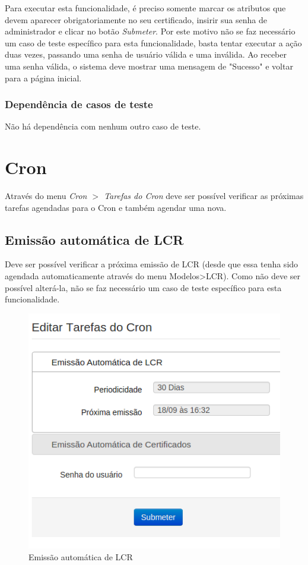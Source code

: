 Para executar esta funcionalidade, é preciso somente marcar os atributos que devem aparecer obrigatoriamente no seu certificado, insirir sua senha de administrador e clicar no botão \textit{Submeter}. Por este motivo não se faz necessário um  caso de teste específico para esta funcionalidade, basta tentar executar a ação duas vezes, passando uma senha de usuário válida e uma inválida. Ao receber uma senha válida, o sistema deve mostrar uma mensagem de "Sucesso" e voltar para a página inicial.

\subsubsection{Dependência de casos de teste}
Não há dependência com nenhum outro caso de teste.

\section{Cron}

Através do menu \textit{Cron $>$ Tarefas do Cron} deve ser possível verificar as próximas tarefas agendadas para o Cron e também agendar uma nova.

\subsection{Emissão automática de LCR}

Deve ser possível verificar a próxima emissão de LCR (desde que essa tenha sido agendada automaticamente através do menu Modelos>LCR). Como não deve ser possível alterá-la, não se faz necessário um  caso de teste específico para esta funcionalidade.

\begin{figure}[ht]
     \centering
     \includegraphics[scale=0.5]{images/cron.png}
     \caption{Emissão automática de LCR}
     \label{fig:cron}
\end{figure}

